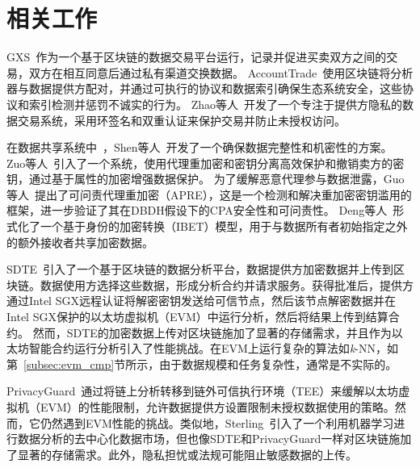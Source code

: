 \section{相关工作}\label{sec:related}
GXS~\cite{gxchain}作为一个基于区块链的数据交易平台运行，记录并促进买卖双方之间的交易，双方在相互同意后通过私有渠道交换数据。
AccountTrade~\cite{accounttrade}使用区块链将分析器与数据提供方配对，并通过可执行的协议和数据索引确保生态系统安全，这些协议和索引检测并惩罚不诚实的行为。
Zhao等人~\cite{zhao}开发了一个专注于提供方隐私的数据交易系统，采用环签名和双重认证来保护交易并防止未授权访问。

在数据共享系统中~\cite{dong2015secure,yue2017big,xia2017medshare}，Shen等人~\cite{shen}开发了一个确保数据完整性和机密性的方案。
Zuo等人~\cite{FG}引入了一个系统，使用代理重加密和密钥分离高效保护和撤销卖方的密钥，通过基于属性的加密增强数据保护。
为了缓解恶意代理参与数据泄露，Guo等人~\cite{APRE}提出了可问责代理重加密（APRE），这是一个检测和解决重加密密钥滥用的框架，进一步验证了其在DBDH假设下的CPA安全性和可问责性。
Deng等人~\cite{IBET}形式化了一个基于身份的加密转换（IBET）模型，用于与数据所有者初始指定之外的额外接收者共享加密数据。

SDTE~\cite{dai2019sdte}引入了一个基于区块链的数据分析平台，数据提供方加密数据并上传到区块链。数据使用方选择这些数据，形成分析合约并请求服务。获得批准后，提供方通过Intel SGX远程认证将解密密钥发送给可信节点，然后该节点解密数据并在Intel SGX保护的以太坊虚拟机（EVM）中运行分析，然后将结果上传到结算合约。
然而，SDTE的加密数据上传对区块链施加了显著的存储需求，并且作为以太坊智能合约运行分析引入了性能挑战。在EVM上运行复杂的算法如\textit{k}-NN，如第~\ref{subsec:evm_cmp}节所示，由于数据规模和任务复杂性，通常是不实际的。

PrivacyGuard~\cite{xiao2020privacyguard}通过将链上分析转移到链外可信执行环境（TEE）来缓解以太坊虚拟机（EVM）的性能限制，允许数据提供方设置限制未授权数据使用的策略。然而，它仍然遇到EVM性能的挑战。类似地，Sterling~\cite{hynes2018demonstration}引入了一个利用机器学习进行数据分析的去中心化数据市场，但也像SDTE和PrivacyGuard一样对区块链施加了显著的存储需求。此外，隐私担忧或法规可能阻止敏感数据的上传。 